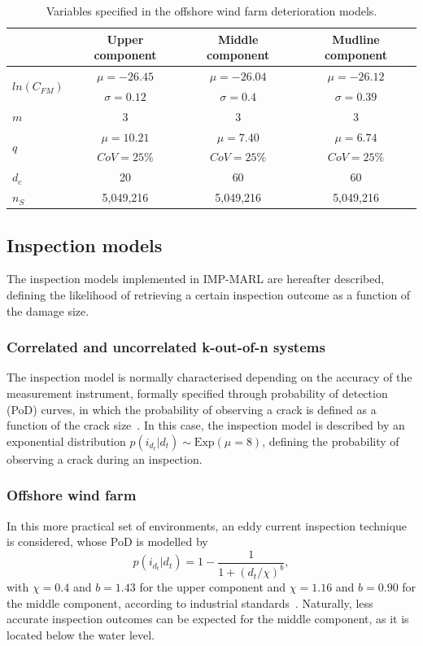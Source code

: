 \begin{table}
\centering
\caption{Variables specified in the offshore wind farm deterioration models.}
\label{tab:owf_fatigue}
\begin{tabular}{lccc}
\toprule
 & Upper component & Middle component & Mudline component  \\
 \midrule
\multirow{2}{*}{$ln(C_{FM})$} & $\mu=-26.45$ & $\mu=-26.04$ & $\mu=-26.12$ \\
& $\sigma=0.12$ & $\sigma=0.4$ &  $\sigma=0.39$ \\
$m$ & 3 & 3 & 3 \\
\multirow{2}{*}{$q$}   & $\mu=10.21$  & $\mu=7.40$ & $\mu=6.74$  \\
 & $CoV=25\% $  & $CoV=25\% $ & $CoV=25\% $  \\
$d_c$ & 20 & 60 & 60 \\
$n_{S}$ & 5,049,216 & 5,049,216 & 5,049,216
\\
\bottomrule
\end{tabular}
\end{table}

\subsection{Inspection models}
The inspection models implemented in IMP-MARL are hereafter described, defining the likelihood of retrieving a certain inspection outcome as a function of the damage size.

\subsubsection{Correlated and uncorrelated k-out-of-n systems}
The inspection model is normally characterised depending on the accuracy of the measurement instrument, formally specified through probability of detection (PoD) curves, in which the probability of observing a crack is defined as a function of the crack size~\citep{morato2022optimal}.
In this case, the inspection model is described by an exponential distribution $p({i_{d_t}}|d_t) \sim \text{Exp}(\mu = 8)$, defining the probability of observing a crack during an inspection.

\subsubsection{Offshore wind farm}
In this more practical set of environments, an eddy current inspection technique is considered, whose PoD is modelled by
\begin{equation} \label{eq:ex_pod1}
    p({i_{d_t}}|d_t) = 1 - \frac{1}{1+(d_t/\chi)^b}, 
\end{equation}
with $\chi=0.4$ and $b=1.43$ for the upper component and $\chi=1.16$ and $b=0.90$ for the middle component, according to industrial standards~\citep{dnv2015probabilistic}.
Naturally, less accurate inspection outcomes can be expected for the middle component, as it is located below the water level.

